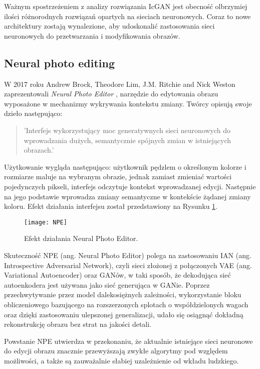     Ważnym spostrzeżeniem z analizy rozwiązania IcGAN jest obecność
    olbrzymiej ilości różnorodnych rozwiązań opartych na sieciach neuronowych.
    Coraz to nowe architektury zostają wynalezione, aby udoskonalić
    zastosowania sieci neuronowych do przetwarzania i modyfikowania obrazów.

  \subsection{Neural photo editing}
    W 2017 roku Andrew Brock, Theodore Lim, J.M. Ritchie and Nick Weston
    zaprezentowali \textit{Neural Photo Editor} \cite{neural_photo_editor}, narzędzie
    do edytowania obrazu wyposażone w mechanizmy wykrywania kontekstu zmiany.
    Twórcy opisują swoje dzieło następująco:

    \begin{quote}
      'Interfejs wykorzystujący moc generatywnych sieci neuronowych do
      wprowadzania dużych, semantycznie spójnych zmian w istniejących obrazach.'
    \end{quote}

    Użytkowanie wygląda następująco: użytkownik pędzlem o określonym kolorze i
    rozmiarze maluje na wybranym obrazie, jednak zamiast zmieniać wartości
    pojedynczych pikseli, interfejs odczytuje kontekst wprowadzanej edycji.
    Następnie na jego podstawie wprowadza zmiany
    semantyczne w kontekście żądanej zmiany koloru. Efekt działania interfejsu
    został przedstawiony na Rysunku \ref{fig:npe}.

    \begin{figure}[ht]
      \centering
      \texttt{[image: NPE]}
      \caption[Efekt działania \textit{Neural Photo Editor} - źródło: \cite{neural_photo_editor}]
      {Efekt działania Neural Photo Editor.}
      \label{fig:npe}
    \end{figure}

    Skuteczność NPE (ang. Neural Photo Editor) polega na zastosowaniu IAN
    (ang. Introspective Adversarial Network), czyli sieci złożonej z połączonych
    VAE (ang. Variational Autoencoder) \cite{vae} oraz GANów, w taki sposób, że dekodująca
    sieć autoenkodera jest używana jako sieć generująca w GANie.
    Poprzez przechwytywanie przez model dalekosiężnych zależności, wykorzystanie
    bloku obliczeniowego bazującego na rozszerzonych splotach o
    współdzielonych wagach oraz dzięki zastosowaniu ulepszonej generalizacji,
    udało się osiągnąć dokładną rekonstrukcję obrazu bez strat na jakości detali.

    Powstanie NPE utwierdza w przekonaniu, że aktualnie istniejące sieci
    neuronowe do edycji obrazu znacznie przewyższają zwykłe algorytmy pod
    względem możliwości, a także są zauważalnie słabiej uzależnienie od wkładu
    ludzkiego.
